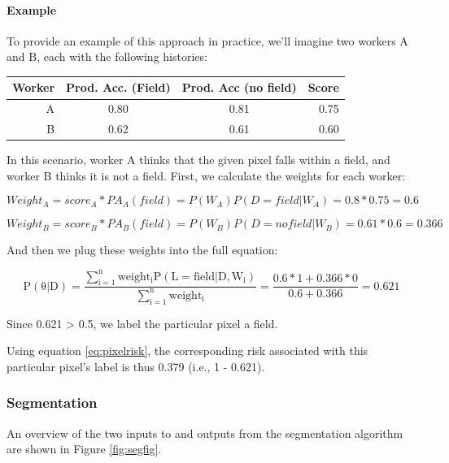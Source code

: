 \documentclass[
  11pt,
  a4paper]{article}
\begin{document}
\hypertarget{example}{%
\paragraph{Example}\label{example}}

To provide an example of this approach in practice, we'll imagine two
workers A and B, each with the following histories:

\begin{longtable}[]{@{}rccr@{}}
\toprule
Worker & Prod. Acc. (Field) & Prod. Acc (no field) & Score \\
\midrule
\endhead
A & 0.80 & 0.81 & 0.75 \\
B & 0.62 & 0.61 & 0.60 \\
\bottomrule
\end{longtable}

In this scenario, worker A thinks that the given pixel falls within a
field, and worker B thinks it is not a field. First, we calculate the
weights for each worker:

\[
Weight_A = score_A * PA_A(field) = P(W_A)P(D=field|W_A) = 0.8 * 0.75 = 0.6
\]

\[
Weight_B = score_B * PA_B(field) = P(W_B)P(D=no field|W_B) = 0.61 * 0.6 = 0.366
\]

And then we plug these weights into the full equation:

\[
\mathrm{P(\theta|D)=\frac{\sum_{i=1}^{n}weight_iP(L = field|D, W_i)}{\sum_{i=1}^{n}weight_i}} = \frac{0.6 * 1 + 0.366 * 0}{0.6 + 0.366} = 0.621
\]

Since 0.621 \textgreater{} 0.5, we label the particular pixel a field.

Using equation \ref{eq:pixelrisk}, the corresponding risk associated
with this particular pixel's label is thus 0.379 (i.e., 1 - 0.621).

\hypertarget{segmentation}{%
\subsubsection{Segmentation}\label{segmentation}}

An overview of the two inputs to and outputs from the segmentation
algorithm are shown in Figure \ref{fig:segfig}.
\end{document}
